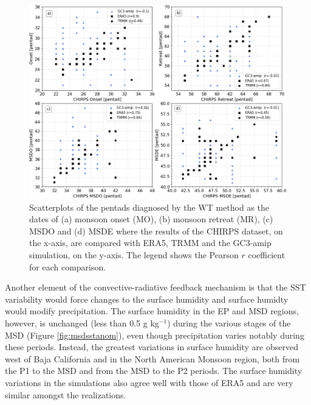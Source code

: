 \begin{figure}[t!]
\includegraphics[width=\linewidth]{figures/master_sst_scatter.png}
\caption[Scatter plot of SST vs precipitation]{Scatterplots of the pentads diagnosed by the WT method as the dates of (a) monsoon onset (MO), (b) monsoon retreat (MR), (c) MSDO and (d) MSDE where the results of the CHIRPS dataset, on the x-axis, are compared with ERA5, TRMM and the GC3-amip simulation, on the y-axis. The legend shows the Pearson $r$ coefficient for each comparison. }
\label{fig:amipsstscatter}
\end{figure}

Another element of the convective-radiative feedback mechanism is that the SST variability would force changes to the surface humidity and surface humidty would modify precipitation. The surface humidity in the EP and MSD regions, however, is unchanged (less than 0.5 g kg$^{-1}$) during the various stages of the MSD (Figure \ref{fig:msdsstanom}), even though precipitation varies notably during these periods. Instead, the greatest variations in surface humidity are observed west of Baja California and in the North American Monsoon region, both from the P1 to the MSD and from the MSD to the P2 periods. %
 The surface humidity variations in the simulations also agree well with those of ERA5 and are very similar amongst the realizations.


